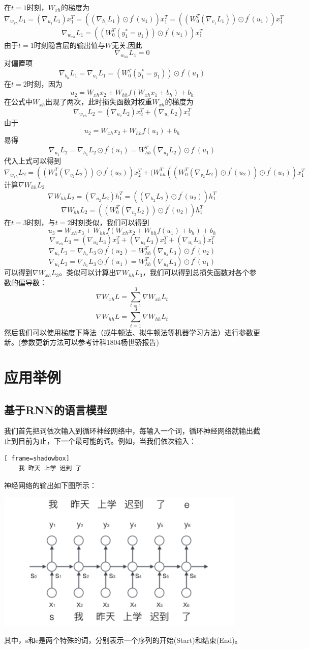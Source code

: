 \documentclass{article}
\begin{document}
在$t=1$时刻，$W_{xh}$的梯度为
$$
\nabla _{w_{xh}}{L_1} =(\nabla_{u_1}L_1)x_1^T=((\nabla_{h_1}L_1)\odot f^{'}(u_1))x_1^T=((W_0^T(\nabla_{v_1}L_1))\odot f^{'}(u_1))x_1^T
$$
$$
\nabla _{w_{xh}}{L_1} =((W_0^T(y_1^*=y_1))\odot f^{'}(u_1))x_1^T
$$
由于$t=1$时刻隐含层的输出值与$W$无关,因此
$$\nabla _{w_{hh}}{L_1} = 0$$
对偏置项
$$\nabla _{b_h}{L_1}=\nabla _{u_1}{L_1}=(W_0^T(y_1^*=y_1))\odot f^{'}(u_1)$$
在$t=2$时刻，因为
$$u_2=W_{xh}x_2+W_{hh}f(W_{xh}x_1+b_h)+b_h$$
在公式中$W_{xh}$出现了两次，此时损失函数对权重$W_{xh}$的梯度为
$$\nabla _{w_{xh}}{L_2}=(\nabla _{u_2}L_2)x_2^T+(\nabla_{u_1}L_2)x_1^T$$
由于
$$u_2=W_{xh}x_2+W_{hh}f(u_1)+b_h$$
易得
$$\nabla_{u_1}L_2=\nabla _{h_1}L_2\odot f^{'}(u_1)=W^T_{hh}(\nabla _{u_2}L_2)\odot f^{'}(u_1)$$
代入上式可以得到
$$\nabla _{w_{xh}}{L_2}=((W_0^T(\nabla _{v_2}L_2))\odot f^{'}(u_2) )x_2^T+(W_{hh}^T((W^T_{0}(\nabla _{v_2}L_2)\odot f^{'}(u_2))\odot f^{'}(u_1))x_1^T$$
计算$\nabla W_{hh}L_2$
$$\nabla W_{hh}L_2=(\nabla _{u_2}L_2)h_1^T=((\nabla _{h_2}L_2)\odot  f^{'}(u_2))h_1^T$$
$$\nabla W_{hh}L_2=((W_0^T(\nabla _{v_2}L_2))\odot f^{'}(u_2))h_1^T$$
在$t=3$时刻，与$t=2$时刻类似，我们可以得到
$$u_{3}=W_{xh}x_3+W_{hh}f(W_{xh}x_2+W_{hh}f(u_1)+b_h)+b_h$$
$$\nabla _{w_{xh}}{L_3}=(\nabla _{u_3}L_3)x_3^T+(\nabla _{u_2}L_3)x_2^T+(\nabla_{u_1}L_3)x_1^T$$
$$\nabla_{u_2}L_3=\nabla _{h_2}L_3\odot f^{'}(u_2)=W^T_{hh}(\nabla _{u_3}L_3)\odot f^{'}(u_2)$$
$$\nabla_{u_1}L_3=\nabla _{h_1}L_3\odot f^{'}(u_1)=W^T_{hh}(\nabla _{u_2}L_3)\odot f^{'}(u_1)$$
可以得到$\nabla W_{xh}L_3$。类似可以计算出$\nabla W_{hh}L_3$，我们可以得到总损失函数对各个参数的偏导数：
$$\nabla W_{xh}L = \sum_{t=1}^{3}\nabla W_{xh}L_t$$
$$\nabla W_{hh}L = \sum_{t=1}^{3}\nabla W_{hh}L_t$$
然后我们可以使用梯度下降法（或牛顿法、拟牛顿法等机器学习方法）进行参数更新。(参数更新方法可以参考计科1804杨世骄报告)
\section{应用举例}
\subsection{基于RNN的语言模型}
我们首先把词依次输入到循环神经网络中，每输入一个词，循环神经网络就输出截止到目前为止，下一个最可能的词。例如，当我们依次输入：
\begin{lstlisting}[ frame=shadowbox]
	我 昨天 上学 迟到 了
\end{lstlisting}
神经网络的输出如下图所示：\par
\centerline{\includegraphics[width=12cm]{language}}
其中，s和e是两个特殊的词，分别表示一个序列的开始(Start)和结束(End)。
\end{document}
